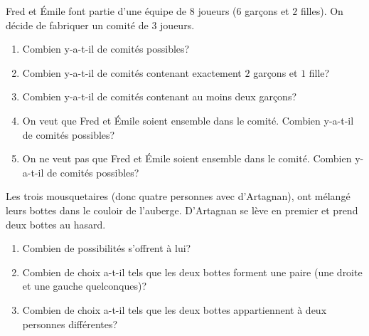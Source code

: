 \documentclass[../PolyS4.tex]{subfiles}
\begin{document}


\vskip0.2cm
Fred et \'Emile font partie d'une équipe de $8$ joueurs ($6$ garçons et $2$ filles). On décide de fabriquer un comité de $3$ joueurs.
\begin{enumerate}
\item Combien y-a-t-il de comités possibles?
\item Combien y-a-t-il de comités contenant exactement $2$ garçons et $1$ fille?
\item Combien y-a-t-il de comités contenant au moins deux garçons?
\item On veut que Fred et \'Emile soient ensemble dans le comité. Combien y-a-t-il de comités possibles?
\item On ne veut pas que Fred et \'Emile soient ensemble dans le comité. Combien y-a-t-il de comités possibles?\\
\end{enumerate}



\newpage 

\vskip0.2cm
Les trois mousquetaires (donc quatre personnes avec d'Artagnan), ont mélangé leurs bottes dans le couloir de l'auberge. D'Artagnan se lève en premier et prend deux bottes au hasard.
\begin{enumerate}
\item Combien de possibilités s'offrent à lui?
\item Combien de choix a-t-il tels que les deux bottes forment une paire (une droite et une gauche quelconques)?
\item Combien de choix a-t-il tels que les deux bottes appartiennent à deux personnes différentes?\\ 
\end{enumerate}








\end{document}
